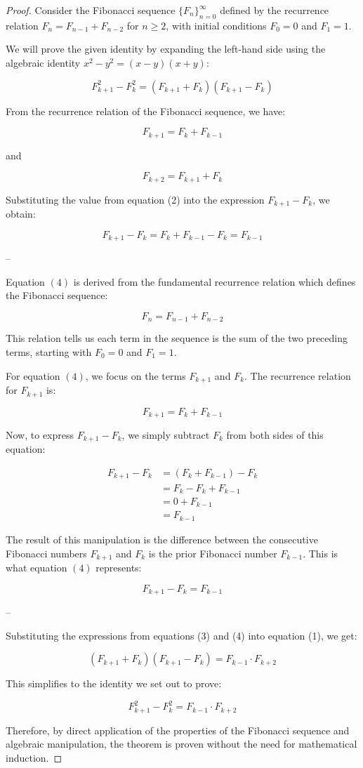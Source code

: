 \documentclass[12pt]{article}
\begin{document}
\begin{proof}
Consider the Fibonacci sequence \( \{F_n\}_{n=0}^\infty \) defined by the recurrence relation \( F_n = F_{n-1} + F_{n-2} \) for \( n \ge 2 \), with initial conditions \( F_0 = 0 \) and \( F_1 = 1 \).

We will prove the given identity by expanding the left-hand side using the algebraic identity \( x^2 - y^2 = (x - y)(x + y) \):

\[ F_{k+1}^2 - F_k^2 = (F_{k+1} + F_k)(F_{k+1} - F_k) \tag{1} \]

From the recurrence relation of the Fibonacci sequence, we have:

\[ F_{k+1} = F_k + F_{k-1} \tag{2} \]

and

\[ F_{k+2} = F_{k+1} + F_k \tag{3} \]

Substituting the value from equation (2) into the expression \( F_{k+1} - F_k \), we obtain:

\[ F_{k+1} - F_k = F_k + F_{k-1} - F_k = F_{k-1} \tag{4} \]

--

Equation \( (4) \) is derived from the fundamental recurrence relation which defines the Fibonacci sequence:

\[ F_{n} = F_{n-1} + F_{n-2} \]

This relation tells us each term in the sequence is the sum of the two preceding terms, starting with \( F_0 = 0 \) and \( F_1 = 1 \).

For equation \( (4) \), we focus on the terms \( F_{k+1} \) and \( F_k \). The recurrence relation for \( F_{k+1} \) is:

\[ F_{k+1} = F_k + F_{k-1} \]

Now, to express \( F_{k+1} - F_k \), we simply subtract \( F_k \) from both sides of this equation:

\[
\begin{aligned}
F_{k+1} - F_k &= (F_k + F_{k-1}) - F_k \\
&= F_k - F_k + F_{k-1} \\
&= 0 + F_{k-1} \\
&= F_{k-1}
\end{aligned}
\]

The result of this manipulation is the difference between the consecutive Fibonacci numbers \( F_{k+1} \) and \( F_k \) is the prior Fibonacci number \( F_{k-1} \). This is what equation \( (4) \) represents:

\[ F_{k+1} - F_k = F_{k-1} \]

--

Substituting the expressions from equations (3) and (4) into equation (1), we get:

\[ (F_{k+1} + F_k)(F_{k+1} - F_k) = F_{k-1} \cdot F_{k+2} \]

This simplifies to the identity we set out to prove:

\[ F_{k+1}^2 - F_k^2 = F_{k-1} \cdot F_{k+2} \]

Therefore, by direct application of the properties of the Fibonacci sequence and algebraic manipulation, the theorem is proven without the need for mathematical induction.
\end{proof}
\end{document}
